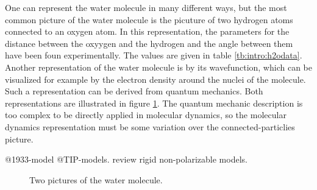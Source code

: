 One can represent the water molecule in many different ways, but the most common picture of the water molecule is the picuture of two hydrogen atoms connected to an oxygen atom. In this representation, the parameters for the distance between the oxyygen and the hydrogen and the angle between them have been foun experimentally. The values are given in table \ref{tb:intro:h2odata}. Another representation of the water molecule is by its wavefunction, which can be visualized for example by the electron density around the nuclei of the molecule. Such a representation can be derived from quantum mechanics. Both representations are illustrated in figure \ref{fig:water_molecule}. The quantum mechanic description is too complex to be directly applied in molecular dynamics, so the molecular dynamics representation must be some variation over the connected-particlies picture. 


@1933-model @TIP-models.  \citet{Vega2011} review rigid non-polarizable models.

\begin{figure}
\begin{minipage}{\textwidth}
\caption{Two pictures of the water molecule.}
\end{minipage}
\label{fig:water_molecule}
\end{figure}

